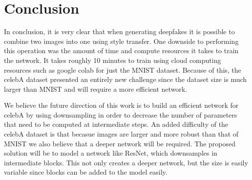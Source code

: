 \documentclass{article}
\begin{document}
\section{Conclusion}

In conclusion, it is very clear that when generating deepfakes it is possible to combine two images into one using style transfer. One downside to
performing this operation was the amount of time and compute resources it takes to train the network. It takes roughly 10 minutes to train using cloud
computing resources such as google colab for just the MNIST dataset. Because of this, the celebA dataset presented an entirely new challenge since the 
dataset size is much larger than MNIST and will require a more efficient network.

We believe the future direction of this work is to build an efficient network for celebA by using downsampling in order to decrease the number of parameters 
that need to be computed at intermediate steps. An added difficulty of the celebA dataset is that becasue images are larger and more robust than that of MNIST
we also believe that a deeper network will be required. The proposed solution will be to model a network like ResNet, which downsamples in intermediate blocks.
This not only creates a deeper network, but the size is easily variable since blocks can be added to the model easily. 

\pagebreak



\end{document}
